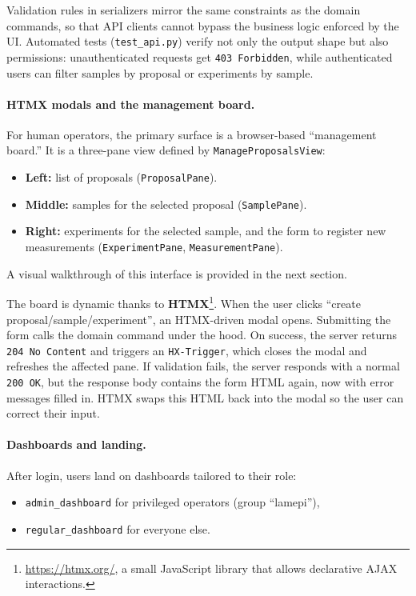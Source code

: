 Validation rules in serializers mirror the same constraints as the domain commands, 
so that API clients cannot bypass the business logic enforced by the UI.  
Automated tests (\texttt{test\_api.py}) verify not only the output shape but also permissions: 
unauthenticated requests get \texttt{403 Forbidden}, 
while authenticated users can filter samples by proposal or experiments by sample.

\paragraph{HTMX modals and the management board.}
For human operators, the primary surface is a browser-based “management board.”  
It is a three-pane view defined by \texttt{ManageProposalsView}:  
\begin{itemize}
	\item \textbf{Left:} list of proposals (\texttt{ProposalPane}).  
	\item \textbf{Middle:} samples for the selected proposal (\texttt{SamplePane}).  
	\item \textbf{Right:} experiments for the selected sample, and the form to register new measurements 
	(\texttt{ExperimentPane}, \texttt{MeasurementPane}).  
\end{itemize}

\noindent A visual walkthrough of this interface is provided in the next section.

The board is dynamic thanks to \textbf{HTMX}\footnote{\url{https://htmx.org/}, a small JavaScript library that allows declarative AJAX interactions.}.  
When the user clicks “create proposal/sample/experiment”, an HTMX-driven modal opens.  
Submitting the form calls the domain command under the hood.  
On success, the server returns \texttt{204 No Content} and triggers an \texttt{HX-Trigger}, 
which closes the modal and refreshes the affected pane.  
If validation fails, the server responds with a normal \texttt{200 OK}, 
but the response body contains the form HTML again, now with error messages filled in. 
HTMX swaps this HTML back into the modal so the user can correct their input.

\paragraph{Dashboards and landing.}
After login, users land on dashboards tailored to their role:  
\begin{itemize}
	\item \texttt{admin\_dashboard} for privileged operators (group “lamepi”),  
	\item \texttt{regular\_dashboard} for everyone else.  
\end{itemize}

